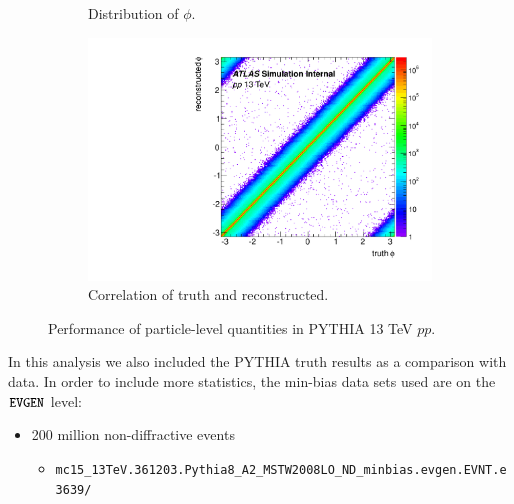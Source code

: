 \begin{figure}[H]
\begin{subfigure}{0.5\textwidth}
\caption{Distribution of $\phi$.}
\end{subfigure}
\begin{subfigure}{0.5\textwidth}
\centering
\includegraphics[width=1.\linewidth]{figs/sec_evtSlc/trkEff_pp13_mon_crr_phi.pdf}
\caption{Correlation of truth and reconstructed.}
\end{subfigure}

\caption{Performance of particle-level quantities in PYTHIA 13 TeV $pp$.}
\label{fig:trkEff_pp13_mon_trk}
\end{figure}

In this analysis we also included the PYTHIA truth results as a comparison with data. In order to include more statistics, the min-bias data sets used are on the $\verb|EVGEN|$ level:
\begin{itemize}
\item 200 million non-diffractive events
\begin{itemize}[leftmargin=*]
\item[] \verb|mc15_13TeV.361203.Pythia8_A2_MSTW2008LO_ND_minbias.evgen.EVNT.e3639/|
\end{itemize}
\end{itemize}


